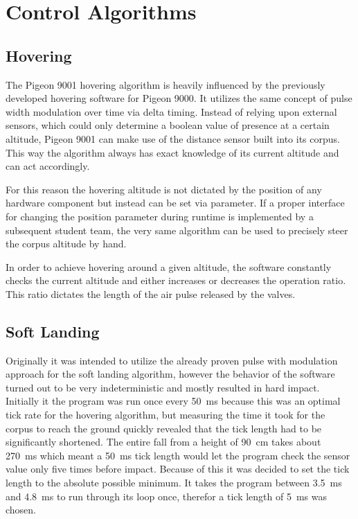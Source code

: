 \section{Control Algorithms}
\author{Sebastian Schaffler}

\subsection{Hovering}

The Pigeon 9001 hovering algorithm is heavily influenced by the previously developed hovering software for Pigeon 9000. It utilizes the same concept of pulse width modulation over time via delta timing. Instead of relying upon external sensors, which could only determine a boolean value of presence at a certain altitude, Pigeon 9001 can make use of the distance sensor built into its corpus. This way the algorithm always has exact knowledge of its current altitude and can act accordingly.

For this reason the hovering altitude is not dictated by the position of any hardware component but instead can be set via parameter. If a proper interface for changing the position parameter during runtime is implemented by a subsequent student team, the very same algorithm can be used to precisely steer the corpus altitude by hand.

In order to achieve hovering around a given altitude, the software constantly checks the current altitude and either increases or decreases the operation ratio. This ratio dictates the length of the air pulse released by the valves.

\subsection{Soft Landing}

Originally it was intended to utilize the already proven pulse with modulation approach for the soft landing algorithm, however the behavior of the software turned out to be very indeterministic and mostly resulted in hard impact. Initially it the program was run once every \SI{50}{\milli\second} because this was an optimal tick rate for the hovering algorithm, but measuring the time it took for the corpus to reach the ground quickly revealed that the tick length had to be significantly shortened. The entire fall from a height of \SI{90}{\centi\meter} takes about \SI{270}{\milli\second} which meant a \SI{50}{\milli\second} tick length would let the program check the sensor value only five times before impact. Because of this it was decided to set the tick length to the absolute possible minimum. It takes the program between \SI{3.5}{\milli\second} and \SI{4.8}{\milli\second} to run through its loop once, therefor a tick length of \SI{5}{\milli\second} was chosen.

